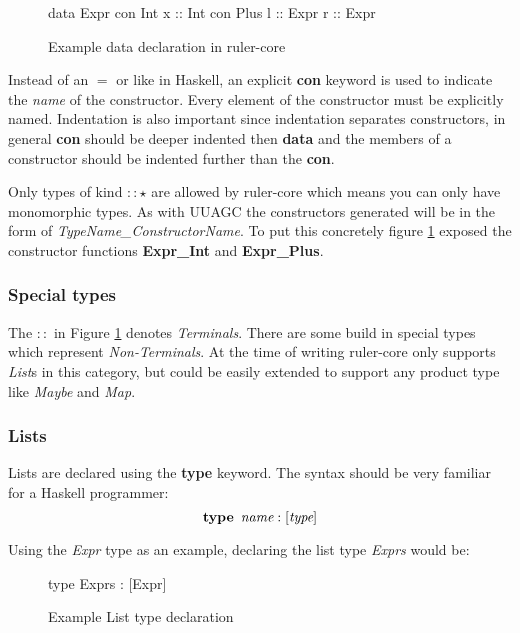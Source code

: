 \begin{figure}[h!]
\begin{code}
data Expr
  con Int
    x :: Int
  con Plus
    l :: Expr
    r :: Expr
\end{code}
\caption{Example data declaration in ruler-core}
\label{data:example}
\end{figure}

Instead of an $=$ or \textbar like in Haskell, an explicit \textbf{con} keyword is used to indicate the \emph{name} of the constructor. Every element of the constructor must be explicitly named. Indentation is also important since indentation separates constructors, in general \textbf{con} should be deeper indented then \textbf{data} and the members of a constructor should be indented further than the \textbf{con}.

Only types of kind $:: \star$ are allowed by ruler-core which means you can only have monomorphic types. As with UUAGC the constructors generated will be in the form of \emph{TypeName\_ConstructorName}. To put this concretely figure \ref{data:example} exposed the constructor functions \textbf{Expr\_Int} and \textbf{Expr\_Plus}.
\subsubsection{Special types}
The $::$ in Figure \ref{data:example} denotes \emph{Terminals}. There are some build in special types which represent \emph{Non-Terminals}. At the time of writing ruler-core only supports \emph{List}s in this category, but could be easily extended to support any product type like \emph{Maybe} and \emph{Map}.

\subsubsection{Lists}
Lists are declared using the \textbf{type} keyword. The syntax should be very familiar for a Haskell programmer: \[ \textbf{type} \hspace{5pt} \emph{name} : [\emph{type}] \]

Using the \emph{Expr} type as an example, declaring the list type \emph{Exprs} would be:

\begin{figure}[h!]
\begin{code}
type Exprs : [Expr]
\end{code}
\caption{Example List type declaration}
\label{type:exprs}
\end{figure}

